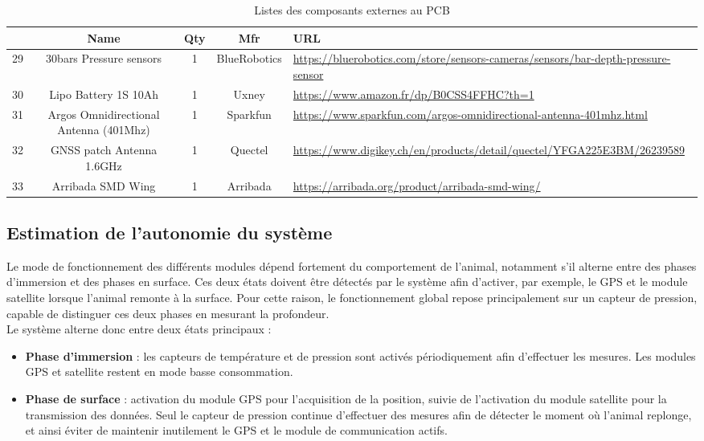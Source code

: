 \documentclass[12pt]{article}
\begin{document}
\begin{table}[h!]
\centering
\scriptsize
\setlength{\tabcolsep}{2.5pt}
\renewcommand{\arraystretch}{1.05}

\begin{tabularx}{\textwidth}{|c|c|c|c|X|}
\hline

\textbf{\rule{0pt}{3.2ex}\#} & 
\textbf{Name} & 
\textbf{Qty} & 
\textbf{Mfr} & 
\textbf{URL} \\ 
\hline \hline

29 & 30bars Pressure sensors & 1 & BlueRobotics & \url{https://bluerobotics.com/store/sensors-cameras/sensors/bar-depth-pressure-sensor}\\ \hline
30 & Lipo Battery 1S 10Ah & 1 & Uxney & \url{https://www.amazon.fr/dp/B0CSS4FFHC?th=1}\\ \hline
31 & Argos Omnidirectional Antenna (401Mhz) & 1 & Sparkfun & \url{https://www.sparkfun.com/argos-omnidirectional-antenna-401mhz.html}\\ \hline
32 & GNSS patch Antenna 1.6GHz & 1 & Quectel & \url{https://www.digikey.ch/en/products/detail/quectel/YFGA225E3BM/26239589}\\ \hline
33 & Arribada SMD Wing & 1 & Arribada & \url{https://arribada.org/product/arribada-smd-wing/}\\ \hline
\end{tabularx}

\caption{Listes des composants externes au PCB}
\label{tab:component_suppl}
\end{table}


\subsection{Estimation de l'autonomie du système}

Le mode de fonctionnement des différents modules dépend fortement du comportement de l’animal, notamment s’il alterne entre des phases d’immersion et des phases en surface. Ces deux états doivent être détectés par le système afin d’activer, par exemple, le GPS et le module satellite lorsque l’animal remonte à la surface. Pour cette raison, le fonctionnement global repose principalement sur un capteur de pression, capable de distinguer ces deux phases en mesurant la profondeur. \\

\noindent Le système alterne donc entre deux états principaux :

\begin{itemize}
    \item \textbf{Phase d’immersion} : les capteurs de température et de pression sont activés périodiquement afin d’effectuer les mesures. Les modules GPS et satellite restent en mode basse consommation.
    \item \textbf{Phase de surface} : activation du module GPS pour l’acquisition de la position, suivie de l’activation du module satellite pour la transmission des données. Seul le capteur de pression continue d’effectuer des mesures afin de détecter le moment où l’animal replonge, et ainsi éviter de maintenir inutilement le GPS et le module de communication actifs.

\end{itemize}
\end{document}
